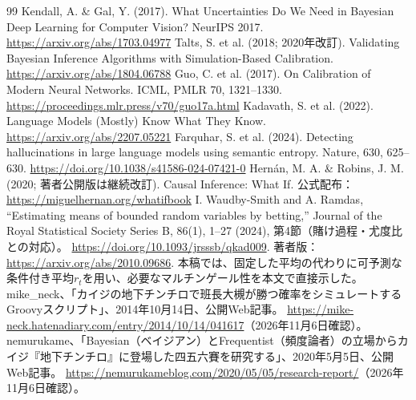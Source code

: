 \documentclass[11pt,a4paper]{article}
\numberwithin{equation}{section}
\begin{document}
\begin{thebibliography}{99}
Kendall, A. \& Gal, Y. (2017). What Uncertainties Do We Need in Bayesian Deep Learning for Computer Vision? NeurIPS 2017. \url{https://arxiv.org/abs/1703.04977}
Talts, S. et al. (2018; 2020年改訂). Validating Bayesian Inference Algorithms with Simulation-Based Calibration. \url{https://arxiv.org/abs/1804.06788}
Guo, C. et al. (2017). On Calibration of Modern Neural Networks. ICML, PMLR 70, 1321–1330. \url{https://proceedings.mlr.press/v70/guo17a.html}
Kadavath, S. et al. (2022). Language Models (Mostly) Know What They Know. \url{https://arxiv.org/abs/2207.05221}
Farquhar, S. et al. (2024). Detecting hallucinations in large language models using semantic entropy. Nature, 630, 625–630. \url{https://doi.org/10.1038/s41586-024-07421-0}
Hernán, M. A. \& Robins, J. M. (2020; 著者公開版は継続改訂). Causal Inference: What If. 公式配布：\url{https://miguelhernan.org/whatifbook}
I. Waudby-Smith and A. Ramdas,
``Estimating means of bounded random variables by betting,''
Journal of the Royal Statistical Society Series B, 86(1), 1--27 (2024), 第4節（賭け過程・尤度比との対応）。
\url{https://doi.org/10.1093/jrsssb/qkad009}.
著者版：\url{https://arxiv.org/abs/2010.09686}.
本稿では、固定した平均の代わりに可予測な条件付き平均$r_t$を用い、必要なマルチンゲール性を本文で直接示した。
mike\_neck、「カイジの地下チンチロで班長大槻が勝つ確率をシミュレートするGroovyスクリプト」、2014年10月14日、公開Web記事。
\url{https://mike-neck.hatenadiary.com/entry/2014/10/14/041617}（2026年11月6日確認）。
nemurukame、「Bayesian（ベイジアン）とFrequentist（頻度論者）の立場からカイジ『地下チンチロ』に登場した四五六賽を研究する」、2020年5月5日、公開Web記事。
\url{https://nemurukameblog.com/2020/05/05/research-report/}（2026年11月6日確認）。
\end{thebibliography}
\end{document}
